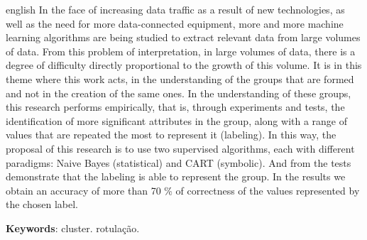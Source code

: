 \begin{resumo}[Abstract]
 \begin{otherlanguage*}{english}
   In the face of increasing data traffic as a result of new technologies, as well as the need for more data-connected equipment, more and more machine learning algorithms are being studied to extract relevant data from large volumes of data. From this problem of interpretation, in large volumes of data, there is a degree of difficulty directly proportional to the growth of this volume. It is in this theme where this work acts, in the understanding of the groups that are formed and not in the creation of the same ones. In the understanding of these groups, this research performs empirically, that is, through experiments and tests, the identification of more significant attributes in the group, along with a range of values ​​that are repeated the most to represent it (labeling). In this way, the proposal of this research is to use two supervised algorithms, each with different paradigms: Naive Bayes (statistical) and CART (symbolic). And from the tests demonstrate that the labeling is able to represent the group. In the results we obtain an accuracy of more than 70 \% of correctness of the values ​​represented by the chosen label.

   \vspace{\onelineskip}
 
   \noindent 
   \textbf{Keywords}:  cluster. rotulação.
 \end{otherlanguage*}
\end{resumo}

